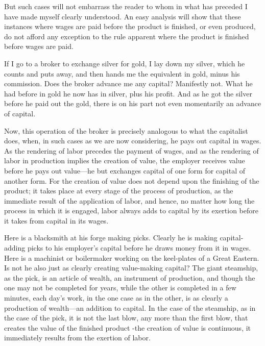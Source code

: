 But such cases will not embarrass the reader to whom in what has
preceded I have made myself clearly understood. An easy analysis will
show that these instances where wages are paid before the product is
finished, or even produced, do not afford any exception to the rule
apparent where the product is finished before wages are paid.

If I go to a broker to exchange silver for gold, I lay down my silver,
which he counts and puts away, and then hands me the equivalent in gold,
minus his commission. Does the broker advance me any capital? Manifestly
not. What he had before in gold he now has in silver, plus his profit.
And as he got the silver before he paid out the gold, there is on his
part not even momentarily an advance of capital.

Now, this operation of the broker is precisely analogous to what the
capitalist does, when, in such cases as we are now considering, he pays
out capital in wages. As the rendering of labor precedes the payment of
wages, and as the rendering of labor in production implies the creation
of value, the employer receives value before he pays out value---he but
exchanges capital of one form for capital of another form. For the
creation of value does not depend upon the finishing of the product; it
takes place at every stage of the process of production, as the
immediate result of the application of labor, and hence, no matter how
long the process in which it is engaged, labor always adds to capital by
its exertion before it takes from capital in its wages.

Here is a blacksmith at his forge making picks. Clearly he is making
capital-adding picks to his employer's capital before he draws money
from it in wages. Here is a machinist or boilermaker working on the
keel-plates of a Great Eastern. Is not he also just as clearly creating
value-making capital? The giant steamship, as the pick, is an article of
wealth, an instrument of production, and though the one may not be
completed for years, while the other is completed in a few minutes, each
day's work, in the one case as in the other, is as clearly a production
of wealth---an addition to capital. In the case of the steamship, as in
the case of the pick, it is not the last blow, any more than the first
blow, that creates the value of the finished product -the creation of
value is continuous, it immediately results from the exertion of labor.


